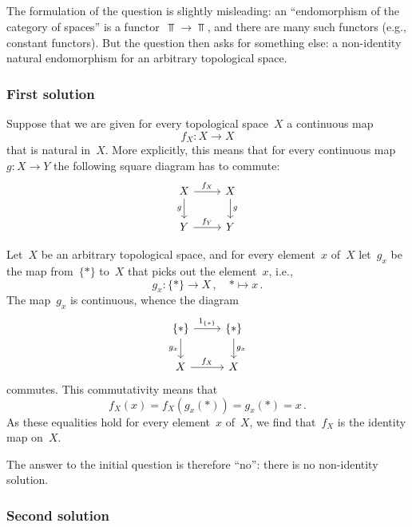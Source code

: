 \subsection{}

\begin{remark}
	The formulation of the question is slightly misleading:
	an \enquote{endomorphism of the category of spaces} is a functor~$\Top \to \Top$, and there are many such functors (e.g., constant functors).
	But the question then asks for something else:
	a non-identity natural endomorphism for an arbitrary topological space.
\end{remark}



\subsubsection*{First solution}

Suppose that we are given for every topological space~$X$ a continuous map
\[
	f_X \colon X \to X
\]
that is natural in~$X$.
More explicitly, this means that for every continuous map~$g \colon X \to Y$ the following square diagram has to commute:
\[
	\begin{tikzcd}
		X
		\arrow{r}[above]{f_X}
		\arrow{d}[left]{g}
		&
		X
		\arrow{d}[right]{g}
		\\
		Y
		\arrow{r}[above]{f_Y}
		&
		Y
	\end{tikzcd}
\]

Let~$X$ be an arbitrary topological space, and for every element~$x$ of~$X$ let~$g_x$ be the map from~$\{ \ast \}$ to~$X$ that picks out the element~$x$, i.e.,
\[
	g_x
	\colon
	\{ \ast \} \to X \,,
	\quad
	\ast \mapsto x \,.
\]
The map~$g_x$ is continuous, whence the diagram
\[
	\begin{tikzcd}
		\{ \ast \}
		\arrow{r}[above]{\id_{\{ \ast \}}}
		\arrow{d}[left]{g_x}
		&
		\{ \ast \}
		\arrow{d}[right]{g_x}
		\\
		X
		\arrow{r}[above]{f_X}
		&
		X
	\end{tikzcd}
\]
commutes.
This commutativity means that
\[
	f_X(x)
	=
	f_X( g_x( \ast ) )
	=
	g_x( \ast )
	=
	x \,.
\]
As these equalities hold for every element~$x$ of~$X$, we find that~$f_X$ is the identity map on~$X$.

The answer to the initial question is therefore \enquote{no}:
there is no non-identity solution.



\subsubsection*{Second solution}

